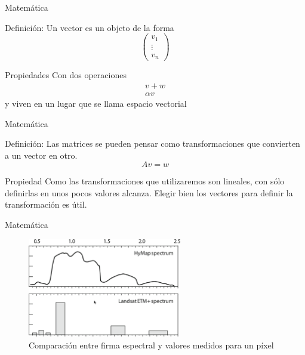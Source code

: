 \documentclass[]{beamer}
\begin{document}
\begin{frame}{Matemática}
  \begin{block}{Definición:}
    Un vector es un objeto de la forma $$\left(
    \begin{array}{c}
          v_1 \\
          \vdots \\
          v_n
        \end{array}
        \right) $$
  \end{block}\pause
  \begin{block}{Propiedades}
    Con dos operaciones
    $$ \begin{array}{c} v+w \\ \alpha v \end{array}  $$
    \pause
    y viven en un lugar que se llama espacio vectorial
  \end{block}
\end{frame}

\begin{frame}{Matemática}
  \begin{block}{Definición:}
    Las matrices se pueden pensar como transformaciones que convierten a un vector en otro. \pause
    $$ Av = w$$
  \end{block}\pause
  \begin{alertblock}{Propiedad}
    Como las transformaciones que utilizaremos son lineales, con sólo definirlas en unos pocos valores alcanza. \pause Elegir bien los vectores para definir la transformación es útil.
  \end{alertblock}
\end{frame}

\begin{frame}{Matemática}
  \begin{figure}
    \includegraphics[width=0.6\textwidth]{imagenes/elandsat.png}
    \caption{Comparación entre firma espectral y valores medidos para un píxel}
  \end{figure}
\end{frame}
\end{document}
